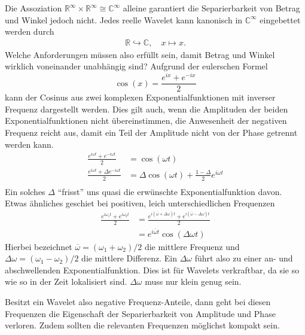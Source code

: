 Die Assoziation $\mathbb{R}^\infty  \times \mathbb{R}^\infty \cong \mathbb{C}^\infty$ alleine garantiert die Separierbarkeit von Betrag und Winkel jedoch nicht.
Jedes reelle Wavelet kann kanonisch in $\mathbb{C}^\infty$ eingebettet werden durch
\begin{align*}
	\mathbb{R} \hookrightarrow \mathbb{C}, \quad x \mapsto x.
\end{align*}
Welche Anforderungen müssen also erfüllt sein, damit Betrag und Winkel wirklich voneinander unabhängig sind?
Aufgrund der eulerschen Formel
\begin{equation}
	\cos(x) = \frac{e^{ix} + e^{-ix}}{2}\label{complex:euler}
\end{equation}
kann der Cosinus aus zwei komplexen Exponentialfunktionen mit inverser Frequenz dargestellt werden.
Dies gilt auch, wenn die Amplituden der beiden Exponentialfunktionen nicht übereinstimmen, die Anwesenheit der negativen Frequenz reicht aus, damit ein Teil der Amplitude nicht von der Phase getrennt werden kann.
\begin{align*}
	\frac{e^{i\omega t} + e^{-i\omega t}}{2} &= \cos(\omega t)\\
	\frac{e^{i\omega t} + \Delta e^{-i\omega t}}{2} &=
	\Delta\cos(\omega t) + \frac{1-\Delta}{2} e^{i\omega t}\\
\end{align*}
Ein solches $\Delta$ ``frisst'' uns quasi die erwünschte Exponentialfunktion davon.
Etwas ähnliches geschiet bei positiven, leich unterschiedlichen Frequenzen
\begin{align*}
	\frac{e^{i\omega_1 t} + e^{i\omega_2 t}}{2} &=
	\frac{e^{i(\overline\omega + \Delta \omega) t} + e^{i(\overline\omega-\Delta\omega) t}}{2} \\
	&= e^{i\overline\omega t}\cos(\Delta\omega t)
\end{align*}
Hierbei bezeichnet $\overline\omega=(\omega_1+\omega_2)/2$ die mittlere Frequenz und $\Delta\omega=(\omega_1-\omega_2)/2$ die mittlere Differenz.
Ein $\Delta\omega$ führt also zu einer an- und abschwellenden Exponentialfunktion.
Dies ist für Wavelets verkraftbar, da sie so wie so in der Zeit lokalisiert sind.
$\Delta\omega$ muss nur klein genug sein.

Besitzt ein Wavelet also negative Frequenz-Anteile, dann geht bei diesen Frequenzen die Eigenschaft der Separierbarkeit von Amplitude und Phase verloren.
Zudem sollten die relevanten Frequenzen möglichst kompakt sein.

